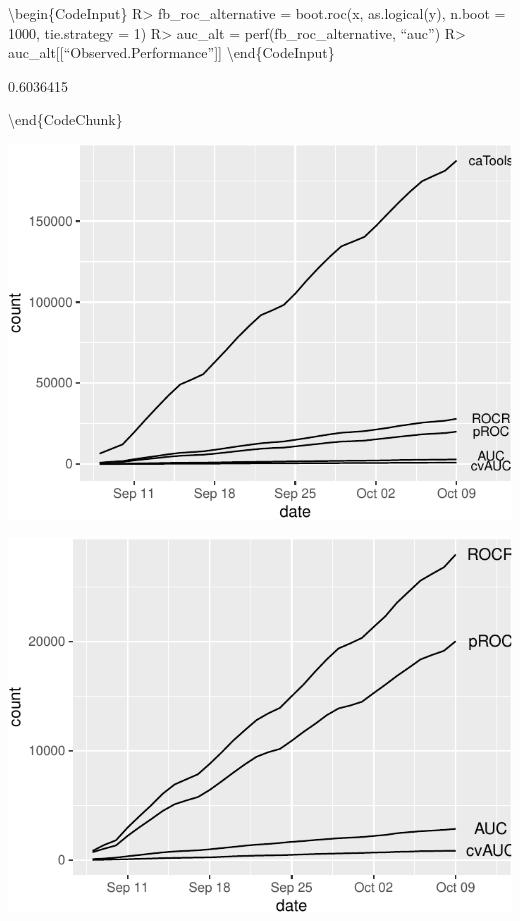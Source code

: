 \documentclass[article]{jss}
\begin{document}
\textbackslash{}begin\{CodeInput\} R\textgreater{} fb\_roc\_alternative
= boot.roc(x, as.logical(y), n.boot = 1000, tie.strategy = 1)
R\textgreater{} auc\_alt = perf(fb\_roc\_alternative, ``auc'')
R\textgreater{} auc\_alt{[}{[}``Observed.Performance''{]}{]}
\textbackslash{}end\{CodeInput\}

\begin{CodeOutput}
[1] 0.6036415
\end{CodeOutput}

\textbackslash{}end\{CodeChunk\}

\begin{CodeChunk}


\begin{center}\includegraphics{index_files/figure-latex/unnamed-chunk-16-1} \end{center}



\begin{center}\includegraphics{index_files/figure-latex/unnamed-chunk-16-2} \end{center}

\end{CodeChunk}
\end{document}
